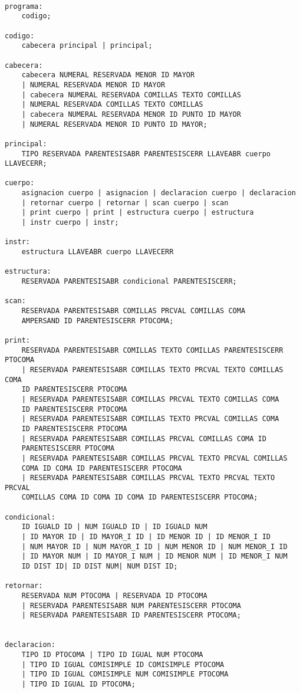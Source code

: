 \documentclass[aspectratio=169]{article}
\begin{document}
\begin{lstlisting}

programa:
	codigo;

codigo:
	cabecera principal | principal;

cabecera:
	cabecera NUMERAL RESERVADA MENOR ID MAYOR
	| NUMERAL RESERVADA MENOR ID MAYOR
	| cabecera NUMERAL RESERVADA COMILLAS TEXTO COMILLAS
	| NUMERAL RESERVADA COMILLAS TEXTO COMILLAS
	| cabecera NUMERAL RESERVADA MENOR ID PUNTO ID MAYOR
	| NUMERAL RESERVADA MENOR ID PUNTO ID MAYOR;

principal:
	TIPO RESERVADA PARENTESISABR PARENTESISCERR LLAVEABR cuerpo LLAVECERR;

cuerpo:
	asignacion cuerpo | asignacion | declaracion cuerpo | declaracion
	| retornar cuerpo | retornar | scan cuerpo | scan
	| print cuerpo | print | estructura cuerpo | estructura
	| instr cuerpo | instr;

instr:
	estructura LLAVEABR cuerpo LLAVECERR

estructura:
	RESERVADA PARENTESISABR condicional PARENTESISCERR;

scan:
	RESERVADA PARENTESISABR COMILLAS PRCVAL COMILLAS COMA
	AMPERSAND ID PARENTESISCERR PTOCOMA;

print:
	RESERVADA PARENTESISABR COMILLAS TEXTO COMILLAS PARENTESISCERR PTOCOMA
	| RESERVADA PARENTESISABR COMILLAS TEXTO PRCVAL TEXTO COMILLAS COMA
	ID PARENTESISCERR PTOCOMA
	| RESERVADA PARENTESISABR COMILLAS PRCVAL TEXTO COMILLAS COMA
	ID PARENTESISCERR PTOCOMA
	| RESERVADA PARENTESISABR COMILLAS TEXTO PRCVAL COMILLAS COMA
	ID PARENTESISCERR PTOCOMA
	| RESERVADA PARENTESISABR COMILLAS PRCVAL COMILLAS COMA ID
	PARENTESISCERR PTOCOMA
	| RESERVADA PARENTESISABR COMILLAS PRCVAL TEXTO PRCVAL COMILLAS
	COMA ID COMA ID PARENTESISCERR PTOCOMA
	| RESERVADA PARENTESISABR COMILLAS PRCVAL TEXTO PRCVAL TEXTO PRCVAL
	COMILLAS COMA ID COMA ID COMA ID PARENTESISCERR PTOCOMA;

condicional:
	ID IGUALD ID | NUM IGUALD ID | ID IGUALD NUM
	| ID MAYOR ID | ID MAYOR_I ID | ID MENOR ID | ID MENOR_I ID
	| NUM MAYOR ID | NUM MAYOR_I ID | NUM MENOR ID | NUM MENOR_I ID
	| ID MAYOR NUM | ID MAYOR_I NUM | ID MENOR NUM | ID MENOR_I NUM
	ID DIST ID| ID DIST NUM| NUM DIST ID;

retornar:
	RESERVADA NUM PTOCOMA | RESERVADA ID PTOCOMA
	| RESERVADA PARENTESISABR NUM PARENTESISCERR PTOCOMA
	| RESERVADA PARENTESISABR ID PARENTESISCERR PTOCOMA;


declaracion:
	TIPO ID PTOCOMA | TIPO ID IGUAL NUM PTOCOMA
	| TIPO ID IGUAL COMISIMPLE ID COMISIMPLE PTOCOMA
	| TIPO ID IGUAL COMISIMPLE NUM COMISIMPLE PTOCOMA
	| TIPO ID IGUAL ID PTOCOMA;


\end{lstlisting}
\end{document}
